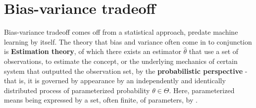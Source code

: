 \documentclass[twoside,10pt]{article}
\begin{document}
\clearpage
\section{Bias-variance tradeoff}

Bias-variance tradeoff comes off from a statistical approach, predate machine learning by itself. The theory that bias and variance often come in to conjunction is \textbf{Estimation theory}, of which there exists an estimator $\hat{\theta}$ that use a set of observations, to estimate the concept, or the underlying mechanics of certain system that outputted the observation set, by the \textbf{probabilistic perspective} - that is, it is governed by appearance by an independently and identically distributed process of parameterized probability $\theta\in \Theta$. Here, parameterized means being expressed by a set, often finite, of parameters, by \cite{LehmannCasella_theory_1998,liam_statistics_2005}. 
\end{document}
